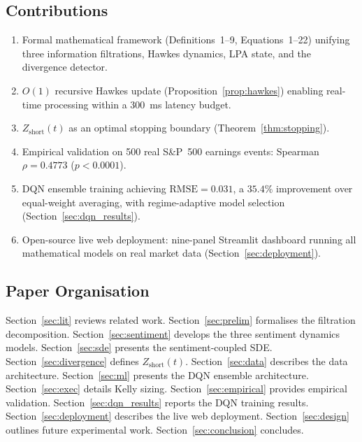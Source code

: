 \documentclass[10pt,twocolumn]{article}
\newcommand{\Zshort}{Z_{\mathrm{short}}}
\newcommand{\RMSE}{\mathrm{RMSE}}
\begin{document}
\subsection{Contributions}

\begin{enumerate}[leftmargin=*,topsep=2pt,itemsep=1pt]
  \item Formal mathematical framework (Definitions~1--9, Equations~1--22)
    unifying three information filtrations, Hawkes dynamics, LPA state, and
    the divergence detector.
  \item $O(1)$ recursive Hawkes update (Proposition~\ref{prop:hawkes}) enabling
    real-time processing within a 300~ms latency budget.
  \item $\Zshort(t)$ as an optimal stopping boundary
    (Theorem~\ref{thm:stopping}).
  \item Empirical validation on 500 real S\&P~500 earnings events:
    Spearman~$\rho=0.4773$ ($p<0.0001$).
  \item DQN ensemble training achieving $\RMSE=0.031$, a $35.4\%$ improvement
    over equal-weight averaging, with regime-adaptive model selection
    (Section~\ref{sec:dqn_results}).
  \item Open-source live web deployment: nine-panel Streamlit dashboard running
    all mathematical models on real market data
    (Section~\ref{sec:deployment}).
\end{enumerate}

\subsection{Paper Organisation}

Section~\ref{sec:lit} reviews related work. Section~\ref{sec:prelim}
formalises the filtration decomposition. Section~\ref{sec:sentiment} develops
the three sentiment dynamics models. Section~\ref{sec:sde} presents the
sentiment-coupled SDE. Section~\ref{sec:divergence} defines $\Zshort(t)$.
Section~\ref{sec:data} describes the data architecture.
Section~\ref{sec:ml} presents the DQN ensemble architecture.
Section~\ref{sec:exec} details Kelly sizing. Section~\ref{sec:empirical}
provides empirical validation. Section~\ref{sec:dqn_results} reports the DQN
training results. Section~\ref{sec:deployment} describes the live web
deployment. Section~\ref{sec:design} outlines future experimental work.
Section~\ref{sec:conclusion} concludes.

\end{document}

